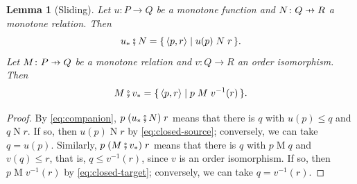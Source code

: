 \documentclass[11pt,a4paper]{article}
\theoremstyle{plain}
\newtheorem{lemma}[theorem]{Lemma}
\theoremstyle{definition}
\theoremstyle{remark}
\newcommand{\then}{\mathbin{\fatsemi}}
\newcommand{\tup}[1]{\langle #1 \rangle}
\newcommand{\profto}{\mathrel{\ooalign{\hfil$\mapstochar\mkern 5mu$\hfil\cr$\to$\cr}}}
\newcommand{\rel}[3]{#1 \mathrel{#2} #3}
\newcommand{\comp}[1]{#1_{*}}
\begin{document}
\begin{lemma}[Sliding]
    \label{lem:sliding}
    Let $u \colon P \to Q$ be a monotone function and $N \colon Q \profto R$ a monotone relation.
    Then
    \begin{equation}
        \label{eq:sliding-left}
        \comp{u} \then N = \{\, \tup{p,r} \mid \rel{u(p)}{N}{r} \,\}.
    \end{equation}
    Let $M \colon P \profto Q$ be a monotone relation and $v \colon Q \to R$ an order isomorphism.
    Then
    \begin{equation}
        \label{eq:sliding-right}
        M \then \comp{v} = \{\, \tup{p,r} \mid \rel{p}{M}{v^{-1}(r)} \,\}.
    \end{equation}
\end{lemma}
\begin{proof}
    By \cref{eq:companion}, $\rel{p}{(\comp{u} \then N)}{r}$ means that there is $q$ with $u(p) \leq q$ and $\rel{q}{N}{r}$.
    If so, then $\rel{u(p)}{N}{r}$ by \cref{eq:closed-source}; conversely, we can take $q = u(p)$.
    Similarly, $\rel{p}{(M \then \comp{v})}{r}$ means that there is $q$ with $\rel{p}{M}{q}$ and $v(q) \leq r$, that is, $q \leq v^{-1}(r)$, since $v$ is an order isomorphism.
    If so, then $\rel{p}{M}{v^{-1}(r)}$ by \cref{eq:closed-target}; conversely, we can take $q = v^{-1}(r)$.
\end{proof}
\end{document}
